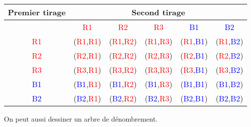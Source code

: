\begin{center}
\begin{tabular}{|c|c|c|c|c|c|}
\hline
Premier tirage &  \multicolumn{5}{|c|}{Second tirage}\\
\hline
 &  \textcolor{red}{R1} & \textcolor{red}{R2} & \textcolor{red}{R3} & \textcolor{blue}{B1} & \textcolor{blue}{B2} \\
 \hline
  \textcolor{red}{R1}&  (\textcolor{red}{R1},\textcolor{red}{R1}) & (\textcolor{red}{R1},\textcolor{red}{R2}) & (\textcolor{red}{R1},\textcolor{red}{R3}) & (\textcolor{red}{R1},\textcolor{blue}{B1}) & (\textcolor{red}{R1},\textcolor{blue}{B2}) \\
 \hline
  \textcolor{red}{R2} &  (\textcolor{red}{R2},\textcolor{red}{R1}) & (\textcolor{red}{R2},\textcolor{red}{R2}) & (\textcolor{red}{R2},\textcolor{red}{R3}) & (\textcolor{red}{R2},\textcolor{blue}{B1}) & (\textcolor{red}{R2},\textcolor{blue}{B2}) \\
   \hline
    \textcolor{red}{R3} &  (\textcolor{red}{R3},\textcolor{red}{R1}) & (\textcolor{red}{R3},\textcolor{red}{R2}) & (\textcolor{red}{R3},\textcolor{red}{R3}) & (\textcolor{red}{R3},\textcolor{blue}{B1}) & (\textcolor{red}{R3},\textcolor{blue}{B2}) \\
    \hline
    \textcolor{blue}{B1} &  (\textcolor{blue}{B1},\textcolor{red}{R1}) & (\textcolor{blue}{B1},\textcolor{red}{R2}) & (\textcolor{blue}{B1},\textcolor{red}{R3}) & (\textcolor{blue}{B1},\textcolor{blue}{B1}) & (\textcolor{blue}{B1},\textcolor{blue}{B2}) \\
\hline    
    \textcolor{blue}{B2} &  (\textcolor{blue}{B2},\textcolor{red}{R1}) & (\textcolor{blue}{B2},\textcolor{red}{R2}) & (\textcolor{blue}{B2},\textcolor{red}{R3}) & (\textcolor{blue}{B2},\textcolor{blue}{B1}) & (\textcolor{blue}{B2},\textcolor{blue}{B2}) \\
\hline
\end{tabular}
\end{center}


On peut aussi dessiner un arbre de dénombrement.

